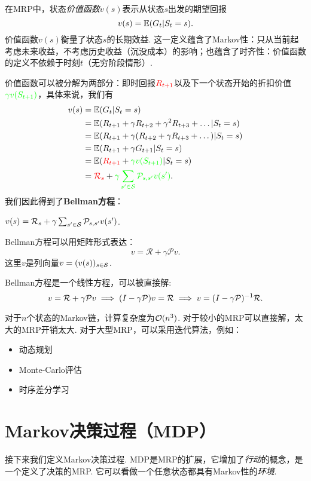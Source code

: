 在MRP中，状态\emph{价值函数}$v(s)$表示从状态$s$出发的期望回报
    \[v(s) = \E(G_t|S_t=s).\]
价值函数$v(s)$衡量了状态$s$的长期效益. 这一定义蕴含了Markov性：只从当前起考虑未来收益，不考虑历史收益（沉没成本）的影响；也蕴含了时齐性：价值函数的定义不依赖于时刻$t$（无穷阶段情形）.

价值函数可以被分解为两部分：即时回报$\textcolor{red}{R_{t+1}}$以及下一个状态开始的折扣价值 $\textcolor{green}{\gamma v(S_{t+1})}$，具体来说，我们有
\begin{align*}
v(s) &= \E(G_t|S_t=s) \\
    &= \E(R_{t+1}+ \gamma R_{t+2} + \gamma^2 R_{t+3}+\dots | S_t= s) \\
    &= \E(R_{t+1} + \gamma (R_{t+2}+\gamma R_{t+3}+\dots) | S_t = s) \\
    &= \E(R_{t+1} + \gamma G_{t+1} | S_t = s) \\
    &= \E(\textcolor{red}{R_{t+1}} + \textcolor{green}{\gamma v(S_{t+1})}| S_t=s)\\
    &= {\textcolor{red}{\mathcal R_s} + \textcolor{green}{\gamma \sum_{s'\in \MS}\P_{s,s'}v(s')}}. %
\end{align*}
我们因此得到了\textbf{Bellman方程}：
\begin{theorem}[Bellman方程]
    $v(s)=\mathcal R_s + \gamma \sum_{s'\in \MS}\P_{s,s'}v(s')$.
\end{theorem}

Bellman方程可以用矩阵形式表达：
        \[v = \mathcal R + \gamma \mathcal P v.\]
这里$v$是列向量$v=(v(s))_{s\in\MS}$.

Bellman方程是一个线性方程，可以被直接解:
\[
    v =\mathcal R + \gamma \P v \implies (I-\gamma \P)v = \mathcal R \implies v = (I-\gamma \P)^{-1} \mathcal R.
\]

对于$n$个状态的Markov链，计算复杂度为$\O(n^3)$. 对于较小的MRP可以直接解，太大的MRP开销太大. 对于大型MRP，可以采用迭代算法，例如：
\begin{itemize}
    \item {}动态规划
    \item {}Monte-Carlo评估
    \item {}时序差分学习
\end{itemize}


\section{Markov决策过程（MDP）}
接下来我们定义Markov决策过程. MDP是MRP的扩展，它增加了\emph{行动}的概念，是一个定义了决策的MRP. 它可以看做一个任意状态都具有Markov性的\emph{环境}.

